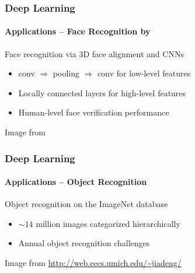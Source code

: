 \documentclass[xetex,professionalfont]{beamer}
\begin{document}
\begin{frame}
\frametitle{Deep Learning}
\framesubtitle{Applications -- Face Recognition by \cite{taigman2013}}

Face recognition via 3D face alignment and CNNs
\begin{itemize}
    \item conv $\Rightarrow$ pooling $\Rightarrow$ conv for low-level features
    \item Locally connected layers for high-level features %
    \item Human-level face verification performance %
\end{itemize}

\bigskip
\begin{center}
    {\centering Image from \cite{taigman2013}}
\end{center}

\end{frame}


\begin{frame}
\frametitle{Deep Learning}
\framesubtitle{Applications -- Object Recognition}

Object recognition on the ImageNet database
\begin{itemize}
    \item $\sim14$ million images categorized hierarchically
    \item Annual object recognition challenges
\end{itemize}

\begin{center}
    {\centering Image from \url{http://web.eecs.umich.edu/~jiadeng/}}
\end{center}

\end{frame}
\end{document}
